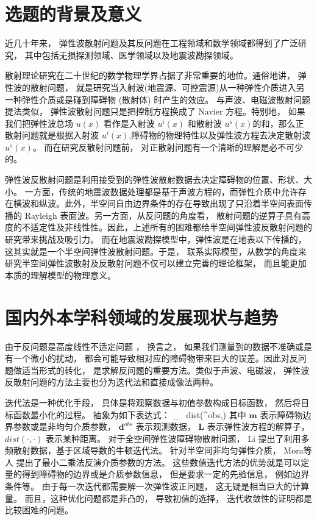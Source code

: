 \section{选题的背景及意义}
近几十年来， 弹性波散射问题及其反问题在工程领域和数学领域都得到了广泛研究\cite{landau}， 其中包括无损探测领域、医学领域以及地震波勘探领域。

散射理论研究在二十世纪的数学物理学界占据了非常重要的地位。通俗地讲， 弹性波的散射问题， 就是研究当入射波(地震源、可控震源)从一种弹性介质进入另一种弹性介质或是碰到障碍物 (散射体) 时产生的效应。 与声波、电磁波散射问题提法类似， 弹性波散射问题只是把控制方程换成了 Navier 方程。特别地， 如果我们把弹性波总场 $u(x)$ 看作是入射波 $u^i(x)$ 和散射波 $u^s(x)$的和，那么正散射问题就是根据入射波 $u^i(x)$,障碍物的物理特性以及弹性波方程去决定散射波 $u^s(x)$。 而在研究反散射问题前， 对正散射问题有一个清晰的理解是必不可少的。

弹性波反散射问题是利用接受到的弹性波散射数据去决定障碍物的位置、形状、大小。 一方面，传统的地震波数据处理都是基于声波方程的，而弹性介质中允许存在横波和纵波。此外，半空间自由边界条件的存在导致出现了只沿着半空间表面传播的 Rayleigh 表面波。另一方面，从反问题的角度看， 散射问题的逆算子具有高度的不适定性及非线性性。因此，上述所有的困难都给半空间弹性波反散射问题的研究带来挑战及吸引力。 而在地震波勘探模型中，弹性波是在地表以下传播的，这其实就是一个半空间弹性波散射问题。于是， 联系实际模型，从数学的角度来研究半空间弹性波散射及反散射问题不仅可以建立完善的理论框架， 而且能更加本质的理解模型的物理意义。


\section{国内外本学科领域的发展现状与趋势}
由于反问题是高度线性不适定问题 \cite{hadamard1923lectures}， 换言之， 如果我们测量到的数据不准确或是有一个微小的扰动， 都会可能导致相对应的障碍物带来巨大的误差。因此对反问题做适当形式的转化， 是求解反问题的重要方法。类似于声波、电磁波， 弹性波反散射问题的方法主要也分为迭代法和直接成像法两种。 

迭代法是一种优化手段， 具体是将观察数据与初值参数构成目标函数， 然后将目标函数最小化的过程。 抽象为如下表达式：
\ben
\min_{} \ dist(^{obs},)
\een
其中 $\mathbf m$ 表示障碍物边界参数或是非均匀介质参数， $\mathbf{d}^{obs}$ 表示观测数据， $\mathbf{{L}}$ 表示弹性波方程的解算子， $dist(\cdot,\cdot)$ 表示某种距离。
对于全空间弹性波障碍物散射问题， Li \cite{li2016inverse} 提出了利用多频散射数据，基于区域导数的牛顿迭代法。 针对半空间非均匀弹性介质， Mora等人 \cite{mora1987nonlinear,feng2017elasti} 提出了最小二乘法反演介质参数的方法。 这些数值迭代方法的优势就是可以定量的得到障碍物的边界或是介质参数信息， 但是要求一定的先验信息， 例如边界条件等。 由于每一次迭代都需要解一次弹性波正问题， 这无疑是相当巨大的计算量。 而且，这种优化问题都是非凸的， 导致初值的选择， 迭代收敛性的证明都是比较困难的问题。 


